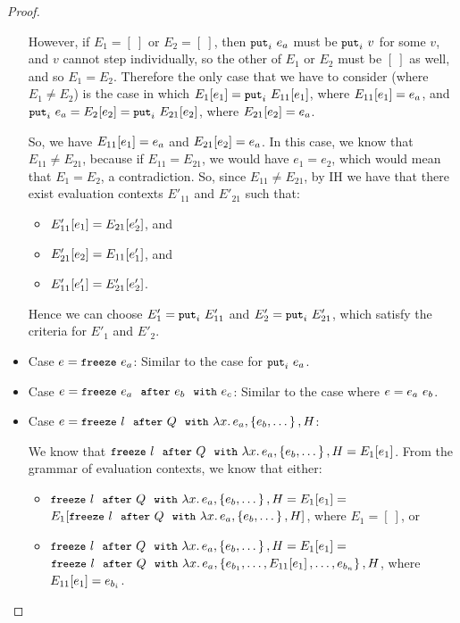 \begin{proof}
\begin{itemize}
      However, if $E_1 = [~]$ or $E_2 = [~]$, then $\mbox{\small{\texttt{put}}}_i~e_a$
      must be $\mbox{\small{\texttt{put}}}_i~v$ for some $v$, and $v$ cannot step
      individually, so the other of $E_1$ or $E_2$ must be $[~]$ as
      well, and so $E_1 = E_2$.  Therefore the only case that we have
      to consider (where $E_1 \neq E_2$) is the case in which
      $E_1\hspace{-0.5mm}\left[e_1\right] = \mbox{\small{\texttt{put}}}_i~E_{11}\hspace{-0.5mm}\left[e_1\right]$, where
      $E_{11}\hspace{-0.5mm}\left[e_1\right] = e_a$, and $\mbox{\small{\texttt{put}}}_i~e_a =
      E_2\hspace{-0.5mm}\left[e_2\right] = \mbox{\small{\texttt{put}}}_i~E_{21}\hspace{-0.5mm}\left[e_2\right]$, where
      $E_{21}\hspace{-0.5mm}\left[e_2\right] = e_a$.

      So, we have $E_{11}\hspace{-0.5mm}\left[e_1\right] = e_a$ and
      $E_{21}\hspace{-0.5mm}\left[e_2\right] = e_a$.  In this case, we know that
      $E_{11} \neq E_{21}$, because if $E_{11} = E_{21}$, we would
      have $e_1 = e_2$, which would mean that $E_1 = E_2$, a
      contradiction.  So, since $E_{11} \neq E_{21}$, by IH we have
      that there exist evaluation contexts $E'_{11}$ and $E'_{21}$
      such that:
      \begin{itemize}
      \item $E'_{11}\hspace{-0.5mm}\left[e_1\right] = E_{21}\hspace{-0.5mm}\left[e'_2\right]$, and
      \item $E'_{21}\hspace{-0.5mm}\left[e_2\right] = E_{11}\hspace{-0.5mm}\left[e'_1\right]$, and
      \item $E'_{11}\hspace{-0.5mm}\left[e'_1\right] = E'_{21}\hspace{-0.5mm}\left[e'_2\right]$.
      \end{itemize}

      Hence we can choose $E'_1 = \mbox{\small{\texttt{put}}}_i~E'_{11}$ and $E'_2 =
      \mbox{\small{\texttt{put}}}_i~E'_{21}$, which satisfy the criteria for $E'_1$ and
      $E'_2$.

    \item Case $e = \mbox{\small{\texttt{freeze}}}~e_a$: Similar to the case for $\mbox{\small{\texttt{put}}}_i~e_a$.

    \item Case $e = \mbox{\small{\texttt{freeze}}}~e_a~~{\mbox{\small{\texttt{after}}}}~e_b~~{\mbox{\small{\texttt{with}}}}~e_c$: Similar to the case
      where $e = e_a~e_b$.

    \item Case $e = \mbox{\small{\texttt{freeze}}}~l~~{\mbox{\small{\texttt{after}}}}~Q~~{\mbox{\small{\texttt{with}}}}~\lambda x.\,e_a, \left\{e_b,
        \dots\right\}, H$:

      We know that $\mbox{\small{\texttt{freeze}}}~l~~{\mbox{\small{\texttt{after}}}}~Q~~{\mbox{\small{\texttt{with}}}}~\lambda x.\,e_a, \left\{e_b,
          \dots\right\}, H = E_1\hspace{-0.5mm}\left[e_1\right]$.  From the grammar of
      evaluation contexts, we know that either:
      \begin{itemize}
        \item $\mbox{\small{\texttt{freeze}}}~l~~{\mbox{\small{\texttt{after}}}}~Q~~{\mbox{\small{\texttt{with}}}}~\lambda x.\,e_a, \left\{e_b,
        \dots\right\}, H = E_1\hspace{-0.5mm}\left[e_1\right] =$ \\
          $E_1\hspace{-0.5mm}\left[\mbox{\small{\texttt{freeze}}}~l~~{\mbox{\small{\texttt{after}}}}~Q~~{\mbox{\small{\texttt{with}}}}~\lambda x.\,e_a, \left\{e_b,
        \dots\right\}, H\right]$, where $E_1 = [~]$, or
        \item $\mbox{\small{\texttt{freeze}}}~l~~{\mbox{\small{\texttt{after}}}}~Q~~{\mbox{\small{\texttt{with}}}}~\lambda x.\,e_a, \left\{e_b,
            \dots\right\}, H = E_1\hspace{-0.5mm}\left[e_1\right] =$ \\
          $\mbox{\small{\texttt{freeze}}}~l~~{\mbox{\small{\texttt{after}}}}~Q~~{\mbox{\small{\texttt{with}}}}~\lambda x.\,e_a, \left\{e_{b_1}, \dots,
              E_{11}\hspace{-0.5mm}\left[e_1\right], \dots, e_{b_n}\right\}, H$, where
          $E_{11}\hspace{-0.5mm}\left[e_1\right] = e_{b_i}$.
      \end{itemize}


\end{itemize}
\end{proof}
